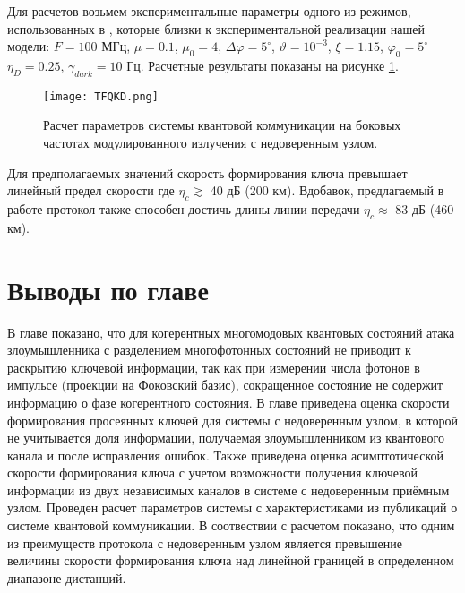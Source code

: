 Для расчетов возьмем экспериментальные параметры одного из режимов, использованных в \cite{Gleim16,Miroshnichenko18}, которые близки к экспериментальной реализации нашей модели: $F=100$ МГц, $\mu=0.1$, $\mu_0=4$, $\Delta\varphi=5^{\circ}$, $\vartheta=10^{-3}$, $\xi=1.15$, $\varphi_0=5^{\circ}$ $\eta_D=0.25$, $\gamma_{dark}= 10$ Гц. Расчетные результаты показаны на рисунке \ref{fig:fig2}.

\begin{figure}
	\texttt{[image: TFQKD.png]}
	\caption{Расчет параметров системы квантовой коммуникации на боковых частотах модулированного излучения с недоверенным узлом.}
	\label{fig:fig2}
\end{figure}

Для предполагаемых значений скорость формирования ключа превышает линейный предел скорости \cite{pirandola2017fundamental} где $\eta_c \gtrsim$ 40 дБ (200 км). Вдобавок, предлагаемый в работе протокол также способен достичь длины линии передачи $\eta_c\approx$ 83 дБ (460 км).



\pagebreak

\section{Выводы по главе} \label{ch:ch6/sec3}
В главе показано, что для когерентных многомодовых квантовых состояний атака злоумышленника с разделением многофотонных состояний не приводит к раскрытию ключевой информации, так как при измерении числа фотонов в импульсе (проекции на Фоковский базис), сокращенное состояние не содержит информацию о фазе когерентного состояния. В главе приведена оценка скорости формирования просеянных ключей для системы с недоверенным узлом, в которой не учитывается доля информации, получаемая злоумышленником из квантового канала и после исправления ошибок. Также приведена оценка асимптотической скорости формирования ключа с учетом возможности получения ключевой информации из двух независимых каналов в системе с недоверенным приёмным узлом. Проведен расчет параметров системы с характеристиками из публикаций о системе квантовой коммуникации. В соотвествии с расчетом показано, что одним из преимуществ протокола с недоверенным узлом является превышение величины скорости формирования ключа над линейной границей в определенном диапазоне дистанций.



